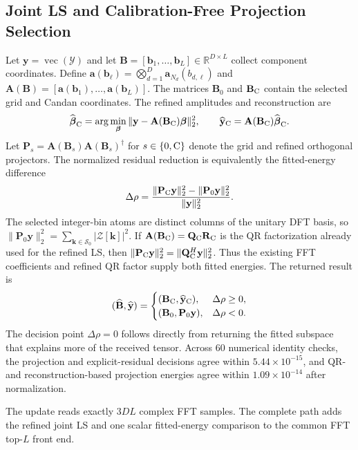 \subsection{Joint LS and Calibration-Free Projection Selection}

Let $\mathbf y=\operatorname{vec}(\mathcal Y)$ and let $\mathbf B=[\mathbf b_1,\ldots,\mathbf b_L]\in\mathbb R^{D\times L}$ collect component coordinates. Define $\mathbf a(\mathbf b_\ell)=\bigotimes_{d=1}^{D}\mathbf a_{N_d}(b_{d,\ell})$ and $\mathbf A(\mathbf B)=[\mathbf a(\mathbf b_1),\ldots,\mathbf a(\mathbf b_L)]$. The matrices $\mathbf B_0$ and $\mathbf B_{\rm C}$ contain the selected grid and Candan coordinates. The refined amplitudes and reconstruction are
\begin{equation}
 \widehat{\boldsymbol{\beta}}_{\rm C}
 =\arg\min_{\boldsymbol{\beta}}
 \|\mathbf{y}-\mathbf{A}(\mathbf{B}_{\rm C})\boldsymbol{\beta}\|_2^2,
 \qquad
 \widehat{\mathbf{y}}_{\rm C}=\mathbf{A}(\mathbf{B}_{\rm C})
 \widehat{\boldsymbol{\beta}}_{\rm C}.
 \label{eq:ls_reconstruction}
\end{equation}
Let $\mathbf P_s=\mathbf A(\mathbf B_s)\mathbf A(\mathbf B_s)^\dagger$ for $s\in\{0,{\rm C}\}$ denote the grid and refined orthogonal projectors. The normalized residual reduction is equivalently the fitted-energy difference
\begin{equation}
 \Delta\rho=\frac{\|\mathbf P_{\rm C}\mathbf y\|_2^2-
 \|\mathbf P_0\mathbf y\|_2^2}{\|\mathbf y\|_2^2}.
 \label{eq:observable_residual}
\end{equation}
The selected integer-bin atoms are distinct columns of the unitary DFT basis, so
$\|\mathbf P_0\mathbf y\|_2^2=\sum_{\mathbf k\in\mathcal S_0}|\mathcal Z[\mathbf k]|^2$.
If $\mathbf A(\mathbf B_{\rm C})=\mathbf Q_{\rm C}\mathbf R_{\rm C}$ is the QR factorization already used for the refined LS, then
$\|\mathbf P_{\rm C}\mathbf y\|_2^2=\|\mathbf Q_{\rm C}^H\mathbf y\|_2^2$.
Thus the existing FFT coefficients and refined QR factor supply both fitted energies. The returned result is
\begin{equation}
 (\widehat{\mathbf{B}},\widehat{\mathbf{y}})=
 \begin{cases}
 (\mathbf{B}_{\rm C},\widehat{\mathbf{y}}_{\rm C}),&\Delta\rho\geq0,\\
 (\mathbf{B}_0,\mathbf P_0\mathbf y),&\Delta\rho<0.
 \end{cases}
 \label{eq:residual_gate}
\end{equation}
The decision point $\Delta\rho=0$ follows directly from returning the fitted subspace that explains more of the received tensor. Across 60 numerical identity checks, the projection and explicit-residual decisions agree within $5.44\times10^{-15}$, and QR- and reconstruction-based projection energies agree within $1.09\times10^{-14}$ after normalization.

The update reads exactly $3DL$ complex FFT samples. The complete path adds the refined joint LS and one scalar fitted-energy comparison to the common FFT top-$L$ front end.
